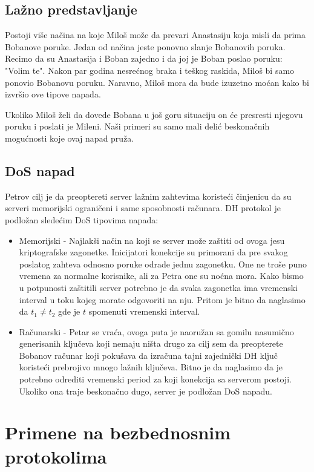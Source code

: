 \documentclass[a4paper]{article}
\begin{document}
\subsection{Lažno predstavljanje}
Postoji više načina na koje Miloš može da prevari Anastasiju koja misli da prima Bobanove poruke. Jedan od načina jeste ponovno slanje Bobanovih poruka. Recimo da su Anastasija i Boban zajedno i da joj je Boban poslao poruku: "Volim te". Nakon par godina nesrećnog braka i teškog raskida, Miloš 
 bi samo ponovio Bobanovu poruku. Naravno, Miloš mora da bude izuzetno moćan kako bi izvršio ove tipove napada.

Ukoliko Miloš želi da dovede Bobana u još goru situaciju on će presresti njegovu poruku i poslati je Mileni. Naši primeri su samo mali delić beskonačnih mogućnosti koje ovaj napad pruža.


\subsection{DoS napad}
Petrov cilj je da preoptereti server lažnim zahtevima koristeći činjenicu da su serveri memorijski ograničeni i same sposobnosti računara. DH protokol je podložan sledećim DoS tipovima napada:
\begin{itemize}
\item Memorijski - Najlakši način na koji se server može zaštiti od ovoga jesu kriptografske zagonetke. Inicijatori konekcije su primorani da pre svakog poslatog zahteva odnosno poruke odrade jednu zagonetku. One ne troše puno vremena za normalne korisnike, ali za Petra one su noćna mora. Kako bismo u potpunosti zaštitili server potrebno je da svaka zagonetka ima vremenski interval u toku kojeg morate odgovoriti na nju. Pritom je bitno da naglasimo da $t_1 \neq t_2$ gde je $t$ spomenuti vremenski interval. 
\item Računarski - Petar se vraća, ovoga puta je naoružan sa gomilu nasumično generisanih ključeva koji nemaju ništa drugo za cilj sem da preopterete Bobanov računar koji pokušava da izračuna tajni zajednički DH ključ koristeći prebrojivo mnogo lažnih ključeva. 
Bitno je da naglasimo da je potrebno odrediti vremenski period za koji konekcija sa serverom postoji. Ukoliko ona traje beskonačno dugo, server je podložan DoS napadu.
\end{itemize}

\section{Primene na bezbednosnim protokolima}
\label{sec:primene}
\end{document}
